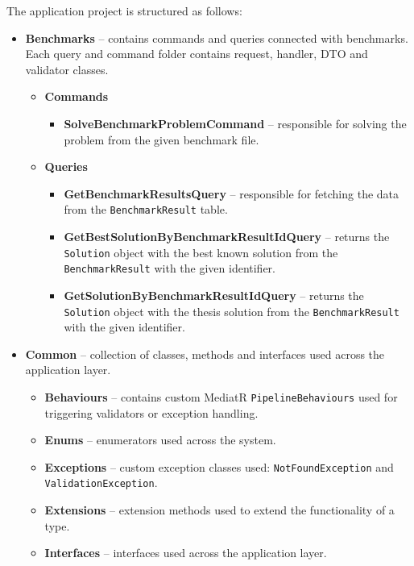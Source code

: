 \documentclass[a4paper,twoside,12pt]{book}
\begin{document}
The application project is structured as follows: 


\begin{itemize}
    \item \textbf{Benchmarks} -- contains commands and queries connected with benchmarks. Each query and command folder contains request, handler, DTO and validator classes.
    \begin{itemize}
    \item \textbf{Commands}
        \begin{itemize}
        \item \textbf{SolveBenchmarkProblemCommand} -- responsible for solving the problem from the given benchmark file. 
        \end{itemize}
    \item \textbf{Queries}
        \begin{itemize}
        \item \textbf{GetBenchmarkResultsQuery} -- responsible for fetching the data from the \lstinline{BenchmarkResult} table.
        \item \textbf{GetBestSolutionByBenchmarkResultIdQuery} -- returns the \lstinline{Solution} object with the best known solution from the \lstinline{BenchmarkResult} with the given identifier.
        \item \textbf{GetSolutionByBenchmarkResultIdQuery} -- returns the \lstinline{Solution} object with the thesis solution from the \lstinline{BenchmarkResult} with the given identifier.
        \end{itemize}
    \end{itemize}
\item \textbf{Common} -- collection of classes, methods and interfaces used across the application layer.
    \begin{itemize}
        \item \textbf{Behaviours} -- contains custom MediatR \lstinline{PipelineBehaviours} used for triggering validators or exception handling.
        \item \textbf{Enums} -- enumerators used across the system.
        \item \textbf{Exceptions} -- custom exception classes used: \lstinline{NotFoundException} and \lstinline{ValidationException}.
        \item \textbf{Extensions} -- extension methods used to extend the functionality of a type.
        \item \textbf{Interfaces} -- interfaces used across the application layer.

\end{itemize}
\end{itemize}
\end{document}
